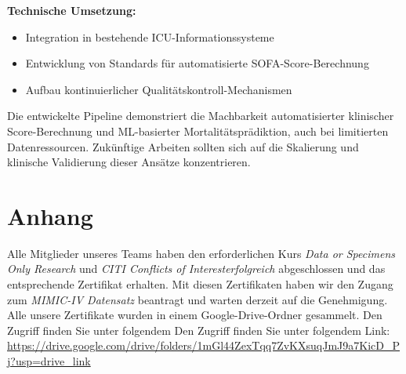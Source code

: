 \documentclass[12pt]{article}
\begin{document}
\textbf{Technische Umsetzung:}
\begin{itemize}
    \item Integration in bestehende ICU-Informationssysteme
    \item Entwicklung von Standards für automatisierte SOFA-Score-Berechnung
    \item Aufbau kontinuierlicher Qualitätskontroll-Mechanismen
\end{itemize}

Die entwickelte Pipeline demonstriert die Machbarkeit automatisierter klinischer Score-Berechnung und ML-basierter Mortalitätsprädiktion, auch bei limitierten Datenressourcen. Zukünftige Arbeiten sollten sich auf die Skalierung und klinische Validierung dieser Ansätze konzentrieren.


\newpage
\appendix

\section{Anhang}

Alle Mitglieder unseres Teams haben den erforderlichen Kurs \textit{Data or Specimens Only Research} und \textit{CITI Conflicts of Interesterfolgreich} abgeschlossen und das entsprechende Zertifikat erhalten. 
Mit diesen Zertifikaten haben wir den Zugang zum \textit{MIMIC-IV Datensatz} beantragt und warten derzeit auf die Genehmigung.
Alle unsere Zertifikate wurden in einem Google-Drive-Ordner gesammelt.
Den Zugriff finden Sie unter folgendem Den Zugriff finden Sie unter folgendem Link: \url{https://drive.google.com/drive/folders/1mGl44ZexTqq7ZvKXsuqJmJ9a7KicD_Pj?usp=drive_link}


\newpage
\end{document}

